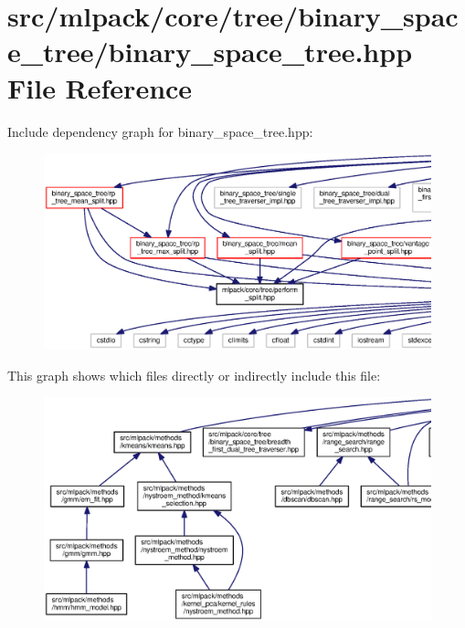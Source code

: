 \section{src/mlpack/core/tree/binary\+\_\+space\+\_\+tree/binary\+\_\+space\+\_\+tree.hpp File Reference}
\label{binary__space__tree_2binary__space__tree_8hpp}
Include dependency graph for binary\+\_\+space\+\_\+tree.\+hpp\+:
\nopagebreak
\begin{figure}[H]
\begin{center}
\leavevmode
\includegraphics[width=350pt]{binary__space__tree_2binary__space__tree_8hpp__incl}
\end{center}
\end{figure}
This graph shows which files directly or indirectly include this file\+:
\nopagebreak
\begin{figure}[H]
\begin{center}
\leavevmode
\includegraphics[width=350pt]{binary__space__tree_2binary__space__tree_8hpp__dep__incl}
\end{center}
\end{figure}
